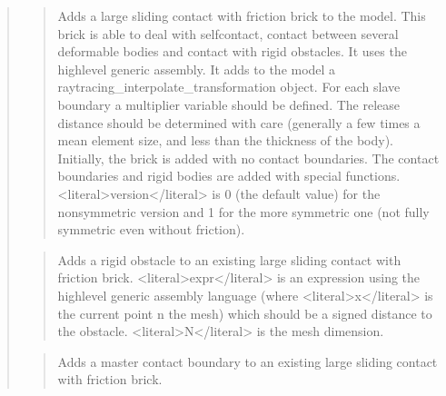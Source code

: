 \documentclass[a4paper,11pt,english]{sphinxmanual}
\begin{document}
\begin{quote}
\begin{quote}
\sphinxAtStartPar
Adds a large sliding contact with friction brick to the model.
This brick is able to deal with self\sphinxhyphen{}contact, contact between
several deformable bodies and contact with rigid obstacles.
It uses the high\sphinxhyphen{}level generic assembly. It adds to the model
a raytracing\_interpolate\_transformation object.
For each slave boundary a multiplier variable should be defined.
The release distance should be determined with care
(generally a few times a mean element size, and less than the
thickness of the body). Initially, the brick is added with no contact
boundaries. The contact boundaries and rigid bodies are added with
special functions. \textless{}literal\textgreater{}version\textless{}/literal\textgreater{} is 0 (the default value) for the
non\sphinxhyphen{}symmetric version and 1 for the more symmetric one
(not fully symmetric even without friction).
\end{quote}

\sphinxAtStartPar
{}
\begin{quote}

\sphinxAtStartPar
Adds a rigid obstacle to an existing large sliding contact
with friction brick. \textless{}literal\textgreater{}expr\textless{}/literal\textgreater{} is an expression using the high\sphinxhyphen{}level
generic assembly language (where \textless{}literal\textgreater{}x\textless{}/literal\textgreater{} is the current point n the mesh)
which should be a signed distance to the obstacle.
\textless{}literal\textgreater{}N\textless{}/literal\textgreater{} is the mesh dimension.
\end{quote}

\sphinxAtStartPar
{}
\begin{quote}

\sphinxAtStartPar
Adds a master contact boundary to an existing large sliding contact
with friction brick.
\end{quote}

\sphinxAtStartPar
{}
\begin{quote}


\end{quote}
\end{quote}
\end{document}
